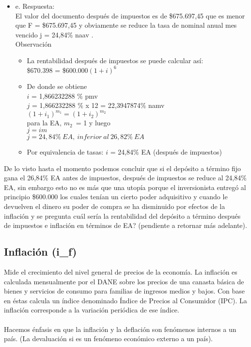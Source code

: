 \begin{itemize}
	\item e. Respuesta:\\
	El valor del documento después de impuestos es de \$675.697,45 que es menor que F = \$675.697,45 y obviamente se reduce la tasa de nominal anual mes vencido j = 24,84\% naav .\\
	
	Observación
	\begin{itemize}
		\item La rentabilidad después de impuestos se puede calcular así:\\ \$670.398 = \$$600.000(1+i)^6$
		\item De donde se obtiene\\
		$i$ = 1,866232288 \% pmv\\
		$j$ = 1,866232288 \% x 12 = 22,3947874\% namv \\
		$(1 + i_1)^{m_1} = (1 + i_2)^{m_2}$\\
        para la EA, $m_2$\ = 1 y luego \\
        $j = i m$\\
        $j = 24,84\%\ EA,\ inferior\ al\ 26,82\%\ EA$\\
		\item Por equivalencia de tasas: 
		$i$ = 24,84\% EA (después de impuestos)\\
	\end{itemize}
	
\end{itemize}
De lo visto hasta el momento podemos concluir que si el depósito a término fijo gana el 26,84\% EA antes de impuestos, después de impuestos se reduce al 24,84\% EA, sin embargo esto no es más que una utopía porque el inversionista entregó al principio \$600.000 los cuales tenían un cierto poder adquisitivo y cuando le devuelven el dinero su poder de compra se ha disminuido por efectos de la inflación y se pregunta cuál sería la rentabilidad del depósito a término después de impuestos e inflación en términos de EA? (pendiente a retornar más adelante).\\

\subsection{Inflación (i_f)}
Mide el crecimiento del nivel general de precios de la economía. La inflación es calculada mensualmente por el DANE sobre los precios de una canasta básica de bienes y servicios de consumo para familias de ingresos medios y bajos. Con base en éstas calcula un índice denominado Índice de Precios al Consumidor (IPC). La inflación corresponde a la variación periódica de ese índice.\\
\\
Hacemos énfasis en que la inflación y la deflación son fenómenos internos a un país. (La devaluación si es un fenómeno económico externo a un país).\\


